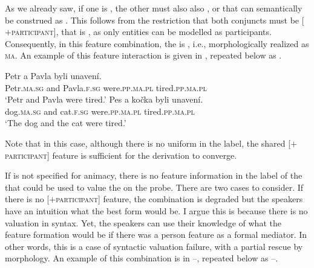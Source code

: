 \documentclass[output=paper,modfontsnewtxmath,hidelinks]{langscibook}
\begin{document}
As we already saw, if one  is  , the other  must also also  , or   that can semantically be construed as . This follows from the restriction that both conjuncts must be [$+$\textsc{participant}], that is , as only  entities can be modelled as participants. Consequently, in this feature combination, the  is , i.e., morphologically realized as \textsc{ma}. An example of this feature interaction is given in , repeated below as .


\ea\label{anim-2-rep}
\ea\gll Petr a Pavla byli unavení.\\
Petr.\textsc{ma.sg} and Pavla.\textsc{f.sg} were.\textsc{pp.ma.pl} tired.\textsc{pp.ma.pl}\\
\glt `Petr and Pavla were tired.'\smallskip
\ex\gll  Pes a kočka byli unavení.\\
dog.\textsc{ma.sg} and cat.\textsc{f.sg} were.\textsc{pp.ma.pl} tired.\textsc{pp.ma.pl}\\
\glt `The dog and the cat were tired.'\\
\z
\hfill {}
\z


\noindent Note that in this case, although there is no uniform  in the label, the shared [$+$\textsc{participant}] feature is sufficient for the derivation to converge.

If  is not specified for animacy, there is no feature information in the label of the  that could be used to value the  on the probe. There are two cases to consider. If there is no [$+$\textsc{participant}] feature, the combination is degraded but the speakers have an intuition what the best form would be. I argue this is because there is no valuation in syntax. Yet, the speakers can use their knowledge of what the feature formation would be if there was a person feature as a formal mediator. In other words, this is a case of syntactic valuation failure, with a partial rescue by morphology. An example of this combination is in --, repeated below as --.


\z
\end{document}
